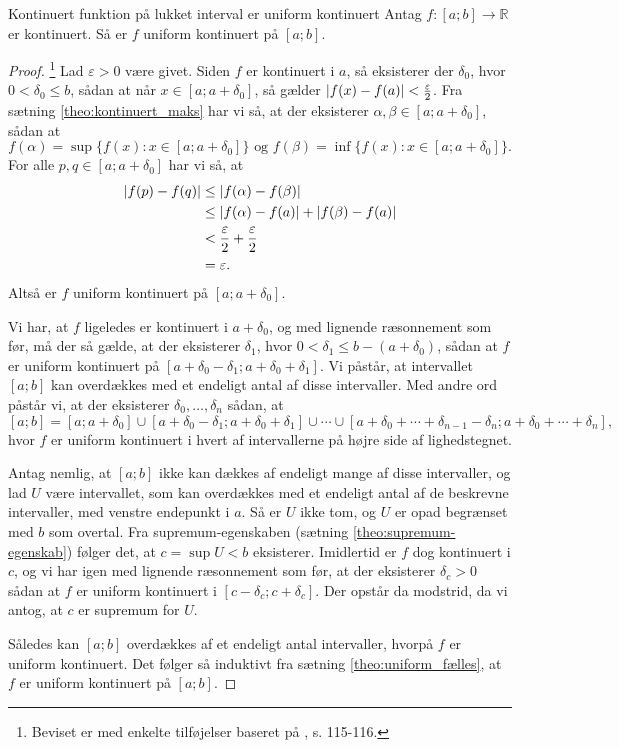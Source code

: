 \begin{theorem}[label=theo:kontinuert_uniform]{Kontinuert funktion på lukket interval er uniform kontinuert}{}
  Antag $f:[a;b]\to \mathbb{R}$ er kontinuert. 
  Så er $f$ uniform kontinuert på $[a;b]$.
\end{theorem}
\begin{proof} 
  \footnote{Beviset er med enkelte tilføjelser baseret på \cite{Clausen1993}, s. 115-116.} 
Lad $\varepsilon >0$ være givet. 
  Siden $f$ er kontinuert i $a$, så eksisterer der $\delta_0$, hvor $0<\delta_0 \leq b$, sådan at når $x \in [a;a+\delta_0 ]$, så gælder $\abs{f(x)-f(a)} < \frac{\varepsilon }{2} $.
  Fra sætning \ref{theo:kontinuert_maks} har vi så, at der eksisterer $\alpha , \beta \in [a;a+\delta_0 ]$, sådan at
  \[
  f(\alpha )=\sup \{ f(x):x \in [a;a+\delta_0 ] \} \text{ og } f(\beta )= \inf \{ f(x):x \in [a;a+\delta_0 ] \}.
  \] 
  For alle $p, q \in [a;a+\delta_0 ]$ har vi så, at
  \begin{equation*}
  \begin{split}
    \abs{f(p)-f(q)} &\leq \abs{f(\alpha )-f(\beta )} \\
    &\leq \abs{f(\alpha )-f(a)} + \abs{f(\beta ) - f(a)} \\
    &<\frac{\varepsilon }{2} + \frac{\varepsilon }{2}\\
    &=\varepsilon.
  \end{split}
  \end{equation*}
  Altså er $f$ uniform kontinuert på $[a;a+\delta_0 ]$.

  Vi har, at $f$ ligeledes er kontinuert i $a + \delta _0$, og med lignende ræsonnement som før, må der så gælde, at der eksisterer $\delta _1$, hvor $0<\delta _1 \leq b-(a+\delta _0)$, sådan at $f$ er uniform kontinuert på $[a+\delta _0-\delta_1;a+\delta_0 + \delta_1]$. 
  Vi påstår, at intervallet $[a;b]$ kan overdækkes med et endeligt antal af disse intervaller. 
  Med andre ord påstår vi, at der eksisterer $\delta _0, \ldots , \delta _n$ sådan, at 
  \[
  [a;b]=[a;a+\delta_0 ] \cup [a+\delta _0-\delta_1;a+\delta_0 + \delta_1] \cup \cdots \cup [a+\delta _0+\cdots +\delta _{n-1}-\delta _n;a+\delta _0+\cdots +\delta _{n}],
  \] 
  hvor $f$ er uniform kontinuert i hvert af intervallerne på højre side af lighedstegnet. 

  Antag nemlig, at $[a;b]$ ikke kan dækkes af endeligt mange af disse intervaller, og lad $U$ være intervallet, som kan overdækkes med et endeligt antal af de beskrevne intervaller, med venstre endepunkt i $a$. 
Så er $U$ ikke tom, og $U$ er opad begrænset med $b$ som overtal. 
  Fra supremum-egenskaben (sætning \ref{theo:supremum-egenskab}) følger det, at $c=\sup U<b$ eksisterer. 
  Imidlertid er $f$ dog kontinuert i $c$, og vi har igen med lignende ræsonnement som før, at der eksisterer $\delta _c>0$ sådan at $f$ er uniform kontinuert i $[c-\delta _c;c+\delta _c]$. 
  Der opstår da modstrid, da vi antog, at $c$ er supremum for $U$. 

Således kan $[a;b]$ overdækkes af et endeligt antal intervaller, hvorpå $f$ er uniform kontinuert.
  Det følger så induktivt fra sætning \ref{theo:uniform_fælles}, at $f$ er uniform kontinuert på $[a;b]$.
\end{proof}

